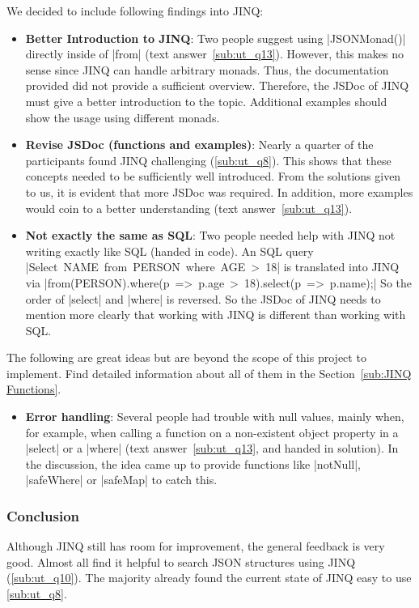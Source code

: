 We decided to include following findings into JINQ:
\begin{itemize}
  \item \textbf{Better Introduction to JINQ}: Two people suggest using
    |JSONMonad()| directly inside of |from| (text answer~\ref{sub:ut_q13}).
    However, this makes no sense since JINQ can handle arbitrary monads. Thus,
    the documentation provided did not provide a sufficient overview.
    Therefore, the JSDoc of JINQ must give a better introduction to the topic.
    Additional examples should show the usage using different monads.
  \item \textbf{Revise JSDoc (functions and examples)}: Nearly a quarter of the participants found JINQ
    challenging (\ref{sub:ut_q8}). This shows that these concepts needed to be
    sufficiently well introduced. From the solutions given to us, it is evident
    that more JSDoc was required. In addition, more examples would coin to a
    better understanding (text answer~\ref{sub:ut_q13}).
    \item \textbf{Not exactly the same as SQL}: Two people needed help with
      JINQ not writing exactly like SQL (handed in code). An SQL query
      |Select~NAME~from~PERSON~where~AGE~>~18| is translated into JINQ via
      |from(PERSON).where(p~=>~p.age~>~18).select(p~=>~p.name);| So the order
      of |select| and |where| is reversed. So the JSDoc of JINQ needs to
      mention more clearly that working with JINQ is different than working
      with SQL.
\end{itemize}

The following are great ideas but are beyond the scope of this project to
implement. Find detailed information about all of them in the
Section~\ref{sub:JINQ Functions}.
\begin{itemize}
  \item \textbf{Error handling}: Several people had trouble with null values,
    mainly when, for example, when calling a  function on a non-existent object
    property in a |select| or a |where| (text answer~\ref{sub:ut_q13}, and
    handed in solution). In the discussion, the idea came up to
    provide functions like |notNull|, |safeWhere| or |safeMap| to catch this.
\end{itemize}
\subsubsection{Conclusion} %
\label{sec:Conclusion}
Although JINQ still has room for improvement, the general feedback is very
good. Almost all find it helpful to search JSON structures using JINQ
(\ref{sub:ut_q10}). The majority already found the current state of JINQ easy
to use \ref{sub:ut_q8}.


